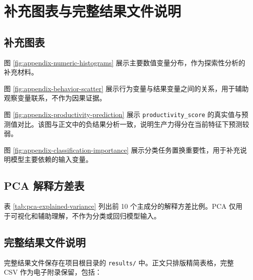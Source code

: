 \chapter{补充图表与完整结果文件说明}

\section{补充图表}

图 \ref{fig:appendix-numeric-histograms} 展示主要数值变量分布，作为探索性分析的补充材料。


图 \ref{fig:appendix-behavior-scatter} 展示行为变量与结果变量之间的关系，用于辅助观察变量联系，不作为因果证据。


图 \ref{fig:appendix-productivity-prediction} 展示 \texttt{productivity\_score} 的真实值与预测值对比。该图与正文中的负结果分析一致，说明生产力得分在当前特征下预测较弱。


图 \ref{fig:appendix-classification-importance} 展示分类任务置换重要性，用于补充说明模型主要依赖的输入变量。


\section{PCA 解释方差表}

表 \ref{tab:pca-explained-variance} 列出前 10 个主成分的解释方差比例。PCA 仅用于可视化和辅助理解，不作为分类或回归模型输入。



\section{完整结果文件说明}

完整结果文件保存在项目根目录的 \texttt{results/} 中。正文只排版精简表格，完整 CSV 作为电子附录保留，包括：

